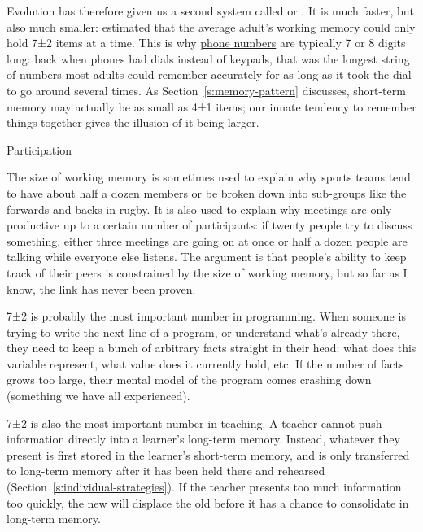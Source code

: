 Evolution has therefore given us a second system called
 or . It is much faster, but also much smaller:
\cite{Mill1956} estimated that the average adult's working memory
could only hold 7±2 items at a time. This is why \href{https://www.quora.com/Why-did-Bell-Labs-create-phone-numbers-of-7-digits-10-digits-Is-there-a-reason-that-dashes-and-brackets-are-used}{phone
numbers} are typically 7 or 8 digits long: back when
phones had dials instead of keypads, that was the longest string of
numbers most adults could remember accurately for as long as it took
the dial to go around several times. As Section~\ref{s:memory-pattern}
discusses, short-term memory may actually be as small as 4±1 items;
our innate tendency to remember things together gives the illusion of
it being larger.

\begin{aside}{Participation}

The size of working memory is sometimes used to explain why sports
teams tend to have about half a dozen members or be broken down into
sub-groups like the forwards and backs in rugby. It is also used to
explain why meetings are only productive up to a certain number of
participants: if twenty people try to discuss something, either three
meetings are going on at once or half a dozen people are talking while
everyone else listens. The argument is that people's ability to keep
track of their peers is constrained by the size of working memory, but
so far as I know, the link has never been proven.

\end{aside}

7±2 is probably the most important number in programming. When
someone is trying to write the next line of a program, or understand
what's already there, they need to keep a bunch of arbitrary facts
straight in their head: what does this variable represent, what value
does it currently hold, etc. If the number of facts grows too large,
their mental model of the program comes crashing down (something we have
all experienced).

7±2 is also the most important number in teaching. A teacher cannot
push information directly into a learner's long-term memory. Instead,
whatever they present is first stored in the learner's short-term
memory, and is only transferred to long-term memory after it has been
held there and rehearsed (Section~\ref{s:individual-strategies}). If the
teacher presents too much information too quickly, the new will
displace the old before it has a chance to consolidate in long-term
memory.

